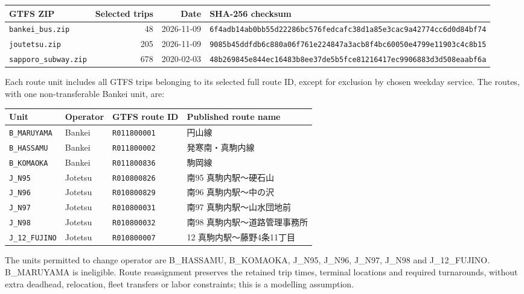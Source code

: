 \documentclass[10pt]{article}
\newcommand{\st}[1]{\texttt{\footnotesize #1}}
\begin{document}
\begin{center}\small
\begin{tabular}{@{}lrrp{7.1cm}@{}}\toprule
GTFS ZIP & Selected trips & Date & SHA-256 checksum \\\midrule
\st{bankei\_bus.zip} & 48 & 2026-11-09 & \texttt{\scriptsize 6f4adb14ab0bb55d22286bc576fedcaf}\newline\texttt{\scriptsize c38d1a85e3cac9a42774cc6d0d84bf74} \\
\st{joutetsu.zip} & 205 & 2026-11-09 & \texttt{\scriptsize 9085b45ddfdb6c880a06f761e224847a}\newline\texttt{\scriptsize 3acb8f4bc60050e4799e11903c4c8b15} \\
\st{sapporo\_subway.zip} & 678 & 2020-02-03 & \texttt{\scriptsize 48b269845e844ec16483b8ee37de5b5f}\newline\texttt{\scriptsize ce81216417ec9906883d3d508eaabf6a} \\
\bottomrule\end{tabular}
\end{center}
Each route unit includes all GTFS trips belonging to its selected full route ID, except for exclusion by chosen weekday service. The routes, with one non-transferable Bankei unit, are:
\begin{center}\small
\begin{tabular}{@{}lllp{5.7cm}@{}}\toprule
Unit & Operator & GTFS route ID & Published route name \\\midrule
\st{B\_MARUYAMA} & Bankei & \st{R011800001} & 円山線 \\
\st{B\_HASSAMU} & Bankei & \st{R011800002} & 発寒南・真駒内線 \\
\st{B\_KOMAOKA} & Bankei & \st{R011800836} & 駒岡線 \\
\st{J\_N95} & Jotetsu & \st{R010800826} & 南95 真駒内駅〜硬石山 \\
\st{J\_N96} & Jotetsu & \st{R010800829} & 南96 真駒内駅〜中の沢 \\
\st{J\_N97} & Jotetsu & \st{R010800031} & 南97 真駒内駅〜山水団地前 \\
\st{J\_N98} & Jotetsu & \st{R010800032} & 南98 真駒内駅〜道路管理事務所 \\
\st{J\_12\_FUJINO} & Jotetsu & \st{R010800007} & 12 真駒内駅〜藤野4条11丁目 \\
\bottomrule\end{tabular}
\end{center}
The units permitted to change operator are B\_HASSAMU, B\_KOMAOKA, J\_N95, J\_N96, J\_N97, J\_N98 and J\_12\_FUJINO. B\_MARUYAMA is ineligible. Route reassignment preserves the retained trip times, terminal locations and required turnarounds, without extra deadhead, relocation, fleet transfers or labor constraints; this is a modelling assumption.
\end{document}
